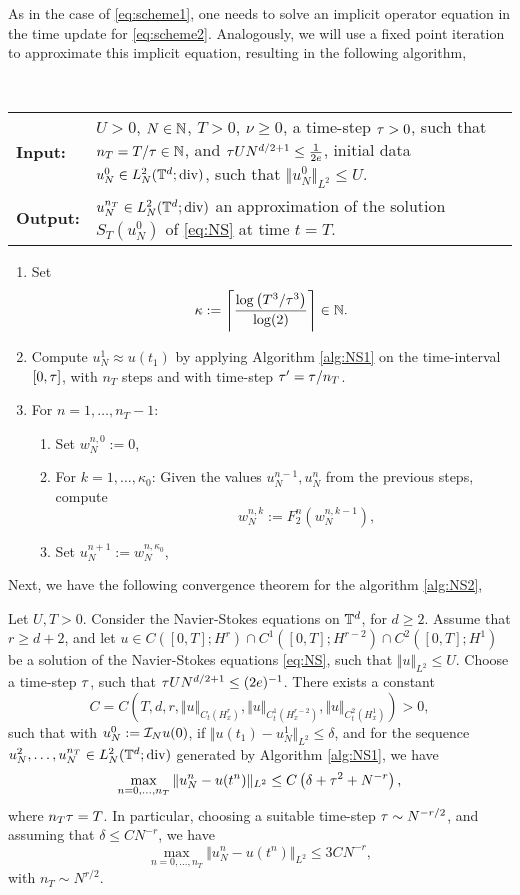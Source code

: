 \documentclass[reqno,a4paper]{amsart}
\begin{document}
As in the case of \eqref{eq:scheme1}, one needs to solve an implicit operator equation in the time update for \eqref{eq:scheme2}. Analogously, we will use a fixed point iteration to approximate this implicit equation, resulting in the following algorithm,
\begin{algorithm} 
\label{alg:NS2}
\phantom{a} \\
\noindent
\begin{tabular}{lp{}}
\textbf{Input:} & 
$U>0$, $N\in \mathbb{N}$, $T>0$, $\nu \ge 0$, a time-step ${\tau}>0$, such that $n_T = T/{\tau} \in \mathbb{N}$, and ${\tau} U N^{d/2+1} \le \frac1{2e}$, initial data $u_N^0 \in L^2_N(\mathbb{T}^d;{\mathrm{div}})$, such that $\Vert u_N^0 \Vert_{L^2} \le U$.
\\
\textbf{Output:} & 
$u_N^{n_T} \in L^2_N(\mathbb{T}^d;{\mathrm{div}})$ an approximation of the solution $S_T(u_N^0)$ of \eqref{eq:NS} at time $t=T$.
\end{tabular}
\begin{enumerate}
\item Set 
\[
\kappa := 
\left\lceil
\frac{\log\left(T^3 /{\tau}^3\right)}{\log(2)}
\right\rceil
\in \mathbb{N}.
\]
\item Compute $u^1_N \approx u(t_1)$ by applying Algorithm \ref{alg:NS1} on the time-interval $[0,{\tau}]$, with $n_T$ steps and with time-step ${\tau}' = {\tau}/n_T$.
\item For $n=1,\dots, n_T-1$:
\begin{enumerate}
\item Set $w^{n,0}_N := 0$,
\item For $k=1,\dots, \kappa_0$: Given the values $u^{n-1}_N, u^n_N$ from the previous steps, compute
\[
\hspace{40pt}
w^{n,k}_N := F_2^n(w^{n,k-1}_N),
\]
\item Set $u^{n+1}_N := w^{n,\kappa_0}_N$,
\end{enumerate}
\end{enumerate}
\end{algorithm}
Next, we have the following convergence theorem for the algorithm \ref{alg:NS2},
\begin{theorem} \label{thm:scheme2}
Let $U,T>0$. Consider the Navier-Stokes equations on $\mathbb{T}^d$, for $d\ge 2$. Assume that $r\ge d +2$, and let $u \in C([0,T]; H^r) \cap C^1([0,T];H^{r-2}) \cap C^2([0,T];H^1)$ be a solution of the Navier-Stokes equations \eqref{eq:NS}, such that $\Vert u \Vert_{L^2}\le U$. Choose a time-step ${\tau}$, such that ${\tau} U N^{d/2+1}\le (2e)^{-1}$. There exists a constant 
\[
C = C(T,d,r,\Vert u \Vert_{C_t(H^r_x)}, \Vert u \Vert_{C^1_t(H^{r-2}_x)}, \Vert u \Vert_{C^2_t(H^{1}_x)}) > 0,
\]
such that with $u^0_N := \mathcal{I}_N u(0)$, if $\Vert u(t_1) - u^1_N \Vert_{L^2} \le \delta$, and for the sequence $u^2_N, \dots, u^{n_T}_N \in L^2_N(\mathbb{T}^d;{\mathrm{div}})$ generated by Algorithm \ref{alg:NS1}, we have
\[
\max_{n=0,\dots, n_T}
\Vert u^n_N - u(t^n) \Vert_{L^2}
\le
C \left(\delta + {\tau}^2 + N^{-r}\right),
\]
where $n_T{\tau} = T$. In particular, choosing a suitable time-step ${\tau} \sim N^{-r/2}$, and assuming that $\delta \le C N^{-r}$, we have
\[
\max_{n=0,\dots, n_T}
\Vert u^n_N - u(t^n) \Vert_{L^2}
\le
3C N^{-r},
\]
with $n_T \sim N^{r/2}$.
\end{theorem}
\end{document}
